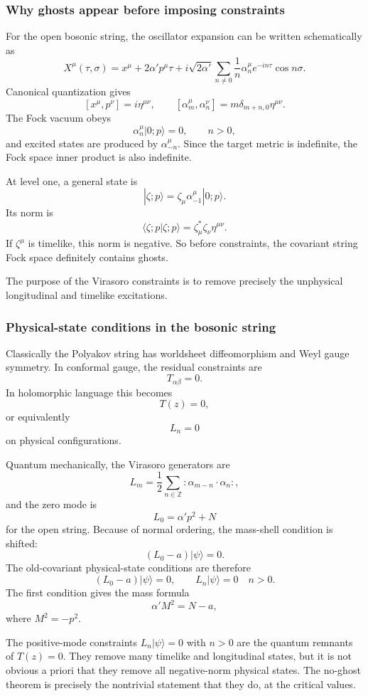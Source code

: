 \documentclass[
  10pt,
  a4paper,
  openany]{book}
\begin{document}
\subsubsection{Why ghosts appear before imposing
constraints}\label{why-ghosts-appear-before-imposing-constraints}

For the open bosonic string, the oscillator expansion can be written
schematically as \[
X^\mu(\tau,\sigma)
=
x^\mu+2\alpha' p^\mu\tau
+i\sqrt{2\alpha'}\sum_{n\neq 0}\frac{1}{n}\alpha_n^\mu e^{-in\tau}\cos n\sigma.
\] Canonical quantization gives \[
[x^\mu,p^\nu]=i\eta^{\mu\nu},
\qquad
[\alpha_m^\mu,\alpha_n^\nu]
=
m\delta_{m+n,0}\eta^{\mu\nu}.
\] The Fock vacuum obeys \[
\alpha_n^\mu|0;p\rangle=0,
\qquad
n>0,
\] and excited states are produced by \(\alpha_{-n}^\mu\). Since the
target metric is indefinite, the Fock space inner product is also
indefinite.

At level one, a general state is \[
|\zeta;p\rangle
=
\zeta_\mu\alpha_{-1}^\mu|0;p\rangle.
\] Its norm is \[
\langle \zeta;p|\zeta;p\rangle
=
\zeta_\mu^*\zeta_\nu\eta^{\mu\nu}.
\] If \(\zeta^\mu\) is timelike, this norm is negative. So before
constraints, the covariant string Fock space definitely contains ghosts.

The purpose of the Virasoro constraints is to remove precisely the
unphysical longitudinal and timelike excitations.

\subsubsection{Physical-state conditions in the bosonic
string}\label{physical-state-conditions-in-the-bosonic-string}

Classically the Polyakov string has worldsheet diffeomorphism and Weyl
gauge symmetry. In conformal gauge, the residual constraints are \[
T_{\alpha\beta}=0.
\] In holomorphic language this becomes \[
T(z)=0,
\] or equivalently \[
L_n=0
\] on physical configurations.

Quantum mechanically, the Virasoro generators are \[
L_m
=
\frac{1}{2}\sum_{n\in\mathbb Z}:\alpha_{m-n}\cdot\alpha_n:,
\] and the zero mode is \[
L_0
=
\alpha' p^2+N
\] for the open string. Because of normal ordering, the mass-shell
condition is shifted: \[
(L_0-a)|\psi\rangle=0.
\] The old-covariant physical-state conditions are therefore \[
(L_0-a)|\psi\rangle=0,
\qquad
L_n|\psi\rangle=0
\quad
n>0.
\] The first condition gives the mass formula \[
\alpha' M^2
=
N-a,
\] where \(M^2=-p^2\).

The positive-mode constraints \(L_n|\psi\rangle=0\) with \(n>0\) are the
quantum remnants of \(T(z)=0\). They remove many timelike and
longitudinal states, but it is not obvious a priori that they remove all
negative-norm physical states. The no-ghost theorem is precisely the
nontrivial statement that they do, at the critical values.
\end{document}
